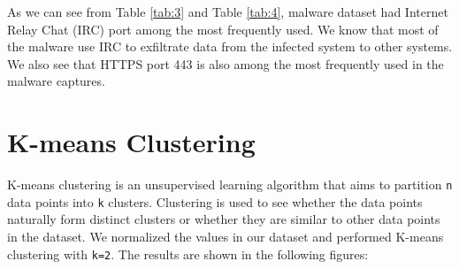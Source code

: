 As we can see from Table \ref{tab:3} and Table \ref{tab:4}, malware dataset had Internet Relay Chat (IRC) port among the most frequently used. We know that most of the malware use IRC to exfiltrate data from the infected system to other systems. We also see that HTTPS port 443 is also among the most frequently used in the malware captures.

\section{K-means Clustering}

K-means clustering is an unsupervised learning algorithm that aims to partition \verb|n| data points into \verb|k| clusters. Clustering is used to see whether the data points naturally form distinct clusters or whether they are similar to other data points in the dataset. We normalized the values in our dataset and performed K-means clustering with \verb|k=2|. The results are shown in the following figures:

